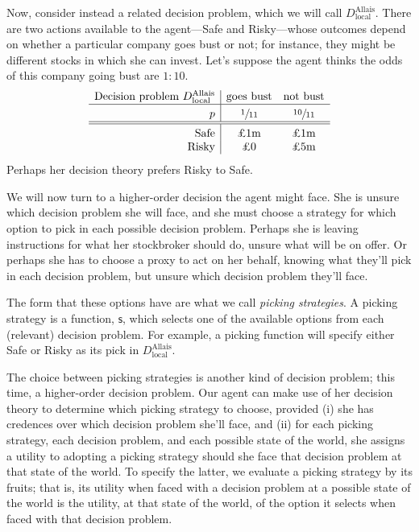 \documentclass[a4paper]{article}
\newcommand\Tstrut{\rule{0pt}{2.6ex}}       %
\newcommand\Bstrut{\rule[-0.9ex]{0pt}{0pt}} %
\newcommand\s{\mathsf{s}}
\newenvironment{CCM rewritten}
{\begingroup\color{blue}} %
{\endgroup}              %
\begin{document}
Now, consider instead a related decision problem, which we will call $D^{\mathrm{Allais}}_{\mathrm{local}}$. There are two actions available to the agent---Safe and Risky---whose outcomes depend on whether a particular company goes bust or not; for instance, they might be different stocks in which she can invest. Let's suppose the agent thinks the odds of this company going bust are $1:10$. 
$$
\begin{array}{r|cc}
	\text{Decision problem } D^{\mathrm{Allais}}_{\mathrm{local}} & \text{goes bust} &  \text{not bust} \Bstrut\\\hline \Tstrut
	p & \sfrac{1}{11} & \sfrac{10}{11}\Bstrut\\\hline\hline \Tstrut
	\text{Safe} &\text{\pounds 1m}&\text{\pounds 1m}                      \\
	\text{Risky} & \text{\pounds 0}&\text{\pounds 5m}
\end{array}
$$
Perhaps her decision theory prefers Risky to Safe. 

We will now turn to a higher-order decision the agent might face.   She is unsure which decision problem she will face, and she must choose a strategy for which option to pick in each possible decision problem. Perhaps she is leaving instructions for what her stockbroker should do, unsure what will be on offer. Or perhaps she has to choose a proxy to act on her behalf, knowing what they'll pick in each decision problem, but unsure which decision problem they'll face. 


The form that these options have are what we call \emph{picking strategies}. 
A picking strategy is a function, $\s$, which selects one of the available options from each (relevant) decision problem. 
For example, a picking function will specify either Safe or Risky as its pick in $D^{\mathrm{Allais}}_{\mathrm{local}}$.

The choice between picking strategies is another kind of decision problem; this time, a higher-order decision problem. Our agent can make use of her decision theory to determine which picking strategy to choose, provided (i) she has credences over which decision problem she'll face, and (ii) for each picking strategy, each decision problem, and each possible state of the world, she assigns a utility to adopting a picking strategy should she face that decision problem at that state of the world. To specify the latter, we evaluate a picking strategy by its fruits; that is, its utility when faced with a decision problem at a possible state of the world is the utility, at that state of the world, of the option it selects when faced with that decision problem.
\end{document}
